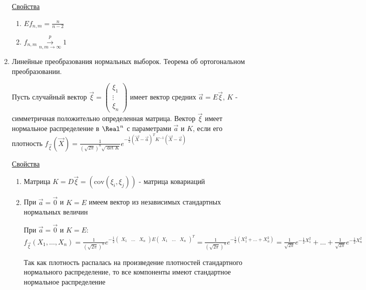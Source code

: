 \begin{enumerate}
    \underline{Свойства}

    \begin{enumerate}
        \item $E f_{n,m} = \frac{n}{n - 2}$

        \item $f_{n,m} \overset{p}{\underset{n, m \to \infty}{\longrightarrow}} 1$
    \end{enumerate}

    \item Линейные преобразования нормальных выборок. Теорема об ортогональном преобразовании.

    \Def Пусть случайный вектор $\vec \xi = \begin{pmatrix}\xi_1 \\ \vdots \\ \xi_n\end{pmatrix}$ имеет вектор средних 
    $\vec a = E \vec \xi$, $K$ - симметричная положительно определенная матрица. Вектор $\vec \xi$ 
    имеет нормальное распределение в $\Real^n$ с параметрами $\vec a$ и $K$, если его плотность 
    $f_{\vec \xi} (\vec X) = \frac{1}{\left(\sqrt{2\pi}\right)^n \sqrt{\det K}} e^{-\frac{1}{2} (\vec X - \vec a)^T K^{-1} (\vec X - \vec a)}$


    \underline{Свойства}

    \begin{enumerate}
        \item Матрица $K = D \vec \xi = \left(\mathrm{cov} (\xi_i, \xi_j)\right)$ - матрица ковариаций

        \item При $\vec a = \vec 0$ и $K = E$ имеем вектор из независимых стандартных нормальных величин

        \begin{MyProof}
            При $\vec a = \vec 0$ и $K = E$: $f_{\vec \xi} (X_1, \dots, X_n) = \frac{1}{\left(\sqrt{2\pi}\right)^n} 
            e^{-\frac{1}{2} \begin{pmatrix}X_1 & \dots & X_n\end{pmatrix} E \begin{pmatrix}X_1 & \dots & X_n\end{pmatrix}^T} = 
            \frac{1}{\left(\sqrt{2\pi}\right)^n} e^{-\frac{1}{2} (X_1^2 + \dots + X_n^2)} = 
            \frac{1}{\sqrt{2\pi}} e^{-\frac{1}{2} X_1^2} + \dots + \frac{1}{\sqrt{2\pi}} e^{-\frac{1}{2} X_n^2}$

            Так как плотность распалась на произведение плотностей стандартного нормального распределение, то все компоненты имеют стандартное нормальное распределение
        \end{MyProof}


\end{enumerate}
\end{enumerate}
